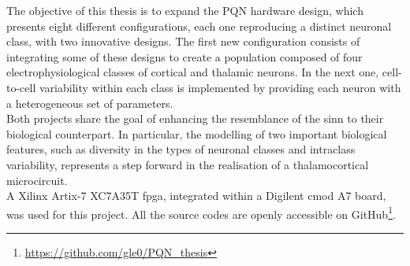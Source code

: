 The objective of this thesis is to expand the PQN hardware design, which presents eight different configurations, each one reproducing a distinct neuronal class, with two innovative designs. The first new configuration consists of integrating some of these designs to create a population composed of four electrophysiological classes of cortical and thalamic neurons. In the next one, cell-to-cell variability within each class is implemented by providing each neuron with a heterogeneous set of parameters.\\
Both projects share the goal of enhancing the resemblance of the \acrshort{sinn} to their biological counterpart. In particular, the modelling of two important biological features, such as diversity in the types of neuronal classes and intraclass variability, represents a step forward in the realisation of a thalamocortical microcircuit.\\

A Xilinx Artix-7 XC7A35T \acrshort{fpga}, integrated 
within a Digilent cmod A7 board, 
was used for this project.
All the source codes are openly accessible on 
GitHub\footnote{\url{https://github.com/gle0/PQN_thesis}}.